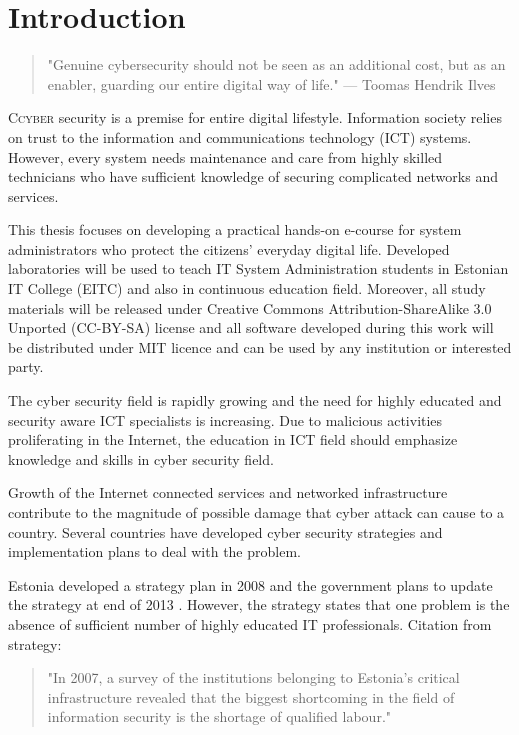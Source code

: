 \chapter{Introduction}
\label{Introduction}

 
\begin{quote}
"Genuine cybersecurity should not be seen as an additional cost, but as an enabler, guarding our entire digital way of life." --- Toomas Hendrik Ilves
\end{quote}

\lettrine[lraise=0.1, nindent=0em, slope=-.5em]{\color{Violet}C}{cyber} security is a premise for entire digital lifestyle. Information society relies on trust to the information and communications technology (\gls{ICT}) systems. However, every system needs maintenance and care from highly skilled technicians who have sufficient knowledge of securing complicated networks and services. 

This thesis focuses on developing a practical hands-on e-course for system administrators who protect the citizens' everyday digital life. Developed laboratories will be used to teach IT System Administration students in Estonian IT College (\gls{EITC}) and also in continuous education field. Moreover, all study materials will be released under Creative Commons Attribution-ShareAlike 3.0 Unported  (\gls{CC-BY-SA}) license and all software developed during this work will be distributed under \gls{MIT} licence and can be used by any institution or interested party.

The cyber security field is rapidly growing and the need for highly educated and security aware \gls{ICT} specialists is increasing. Due to  malicious activities proliferating in the Internet, the education in \gls{ICT} field should emphasize knowledge and skills in cyber security field.

Growth of the Internet connected services and networked infrastructure contribute to the magnitude of possible damage that cyber attack can cause to a country. Several countries have developed cyber security strategies and implementation plans to deal with the problem.

Estonia developed a strategy plan in 2008 \citep{Strategy2008} and the government plans to update the strategy at end of 2013 \citep{StrategyProposal2013}. However, the strategy states that one problem is the absence of sufficient number of highly educated IT professionals. Citation from strategy:  
\begin{quote}
"In 2007, a survey of the institutions belonging to Estonia’s critical infrastructure revealed that the biggest shortcoming in the field of information security is the shortage of qualified labour." \citep[p.~16]{Strategy2008}
\end{quote}

